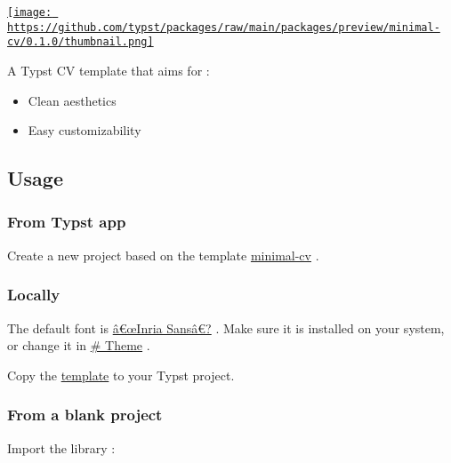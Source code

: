 \href{https://github.com/typst/packages/raw/main/packages/preview/minimal-cv/0.1.0/thumbnail.png}{\texttt{[image: https://github.com/typst/packages/raw/main/packages/preview/minimal-cv/0.1.0/thumbnail.png]}}

A Typst CV template that aims for :

\begin{itemize}
\tightlist
\item
  Clean aesthetics
\item
  Easy customizability
\end{itemize}

\subsection{Usage}\label{usage}

\subsubsection{From Typst app}\label{from-typst-app}

Create a new project based on the template
\href{https://typst.app/universe/package/minimal-cv}{minimal-cv} .

\subsubsection{Locally}\label{locally}

The default font is
\href{https://fonts.google.com/specimen/Inria+Sans}{â€œInria Sansâ€?} .
Make sure it is installed on your system, or change it in
\href{https://github.com/typst/packages/raw/main/packages/preview/minimal-cv/0.1.0/\#theme}{\#
Theme} .

Copy the
\href{https://raw.githubusercontent.com/lelimacon/typst-minimal-cv/main/template/cv.typ}{template}
to your Typst project.

\subsubsection{From a blank project}\label{from-a-blank-project}

Import the library :

\begin{Shaded}
\begin{Highlighting}[]
\end{Highlighting}
\end{Shaded}

